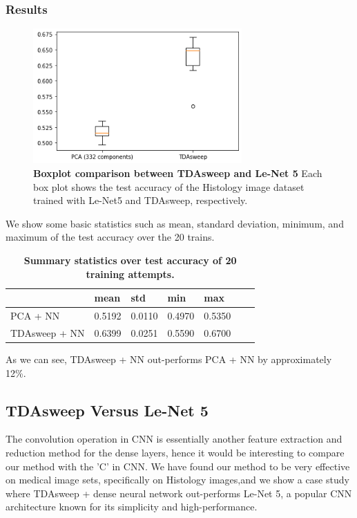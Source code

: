 \documentclass{article}
\begin{document}
\subsubsection{Results}


\begin{figure}[!ht]
\centering
\includegraphics[width=8cm]{pca_vs_tdasweep.png}
\caption{{\bf Boxplot comparison between TDAsweep and Le-Net 5} Each box plot shows the test accuracy of the Histology image dataset trained with Le-Net5 and TDAsweep, respectively.}
\label{pca_tdasweep}
\end{figure}

We show some basic statistics such as mean, standard deviation, minimum, and maximum of the test accuracy over the 20 trains.
\begin{table}[!ht]
\centering
\caption{{\bf Summary statistics over test accuracy of 20 training attempts.}}
\begin{tabular}{|l|l|l|l|l|l|l|}
\hline
\multicolumn{1}{|l|}{} & \multicolumn{1}{|l|}{\bf mean} & \multicolumn{1}{|l|}{\bf std} & \multicolumn{1}{|l|}{\bf min}& \multicolumn{1}{|l|}{\bf max}\\ \hline
PCA + NN & 0.5192 & 0.0110 & 0.4970 & 0.5350 \\ \hline
TDAsweep + NN & 0.6399 & 0.0251 & 0.5590 & 0.6700 \\ \hline


\end{tabular}
\label{tda_aug}
\end{table}

As we can see, TDAsweep + NN out-performs PCA + NN by approximately 12\%.

\subsection{TDAsweep Versus Le-Net 5}
The convolution operation in CNN is essentially another feature extraction and reduction method for the dense layers, hence it would be interesting to compare our method with the 'C' in CNN. We have found our method to be very effective on medical image sets, specifically on Histology images,and we show a case study where TDAsweep + dense neural network out-performs Le-Net 5, a popular CNN architecture known for its simplicity and high-performance. 
\end{document}
